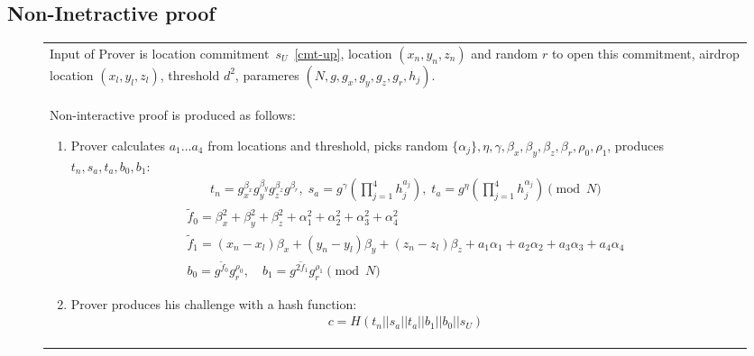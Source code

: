 \documentclass{article}
\begin{document}
\subsection {Non-Inetractive proof}
\begin{figure}[!htb]
\begin{tabular}{|p{\linewidth}|}
\hline

Input of Prover is
  location commitment~$s_U$~\eqref{cmt-up},
  location $(x_n, y_n, z_n)$ and random $r$ to open this commitment,
  airdrop location $(x_l, y_l, z_l)$,
  threshold $d^2$,
  parameres $(N, g, g_x, g_y, g_z, g_r, h_j)$.
\\
Non-interactive proof is produced as follows:
\begin{enumerate}
\item
  Prover calculates $a_1 \dots a_4$ from locations and threshold,
  picks random $\{\alpha_j\}, \eta, \gamma, \beta_x, \beta_y, \beta_z, \beta_r, \rho_0, \rho_1$,
  produces $t_n, s_a, t_a, b_0, b_1$:
\begin{gather}
  t_n = g_x^{\beta_x} g_y^{\beta_y} g_z^{\beta_z} g^{\beta_r}, \;
  s_a = g^{\gamma} (\prod_{j=1}^4 h_j^{a_j}),  \;
  t_a = g^{\eta} (\prod_{j=1}^4 h_j^{\alpha_j}) \pmod{N}
\end{gather}
\begin{gather}
  \tilde f_0 = \beta_x^2 + \beta_y^2 +\beta_z^2 + \alpha_1^2 + \alpha_2^2 + \alpha_3^2 + \alpha_4^2  \\
  \tilde f_1 = (x_n - x_l) \beta_x  + (y_n - y_l) \beta_y  + (z_n - z_l) \beta_z + a_1 \alpha_1 + a_2 \alpha_2 + a_3 \alpha_3 + a_4 \alpha_4 \\
  b_0 = g^{\tilde f_0} g_r^{\rho_0},   \quad
  b_1 = g^{2 \tilde f_1} g_r^{\rho_1} \pmod{N}
\end{gather}

\item
  Prover produces his challenge with a hash function:
\begin{gather}
  c = H(t_n || s_a || t_a || b_1 || b_0 || s_U)
\end{gather}


\end{enumerate}
\end{tabular}
\end{figure}
\end{document}
